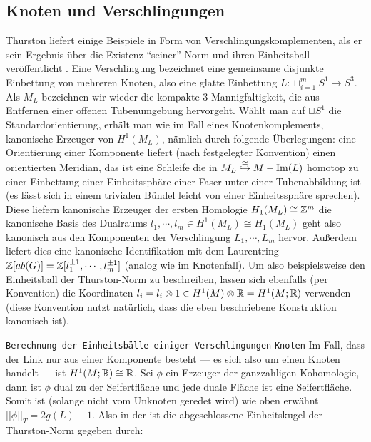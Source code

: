     \subsection{Knoten und Verschlingungen}
    \label{sec:links}
    \begin{bsp}[Verschlingungen]
    \label{ex:links}
        Thurston liefert einige Beispiele in Form von Verschlingungskomplementen, als er sein Ergebnis über die Existenz "`seiner"' Norm und ihren Einheitsball veröffentlicht \cite{Thurston.1986}. Eine Verschlingung bezeichnet eine gemeinsame disjunkte Einbettung von mehreren Knoten, also eine glatte Einbettung $L: \sqcup_{i=1}^m S^1 \to S^3$. Als $M_L$ bezeichnen wir wieder die kompakte 3-Mannigfaltigkeit, die aus Entfernen einer offenen Tubenumgebung hervorgeht. Wählt man auf $\sqcup S^1$ die Standardorientierung, erhält man wie im Fall eines Knotenkomplements, kanonische Erzeuger von $H^1(M_L)$, nämlich durch folgende Überlegungen: eine Orientierung einer Komponente liefert (nach festgelegter Konvention) einen orientierten Meridian, das ist eine Schleife die in $M_L\stackrel \simeq {\hookrightarrow} M - \operatorname{Im}(L)$ homotop zu einer Einbettung einer Einheitssphäre einer Faser unter einer Tubenabbildung ist (es lässt sich in einem trivialen Bündel leicht von einer Einheitssphäre sprechen). Diese liefern kanonische Erzeuger der ersten Homologie $H_1(M_L) \cong \mathbb{Z}^m$ die kanonische Basis des Dualraums $l_1,\cdots,l_m \in H^1(M_L)\cong H_1(M_L)$ geht also kanonisch aus den Komponenten der Verschlingung $L_1,\cdots,L_m$ hervor. Außerdem liefert dies eine kanonische Identifikation mit dem Laurentring $\mathbb{Z}[ab(G)]=\mathbb{Z}[l_1^{\pm 1},\cdots,l_m^{\pm 1}]$ (analog wie im Knotenfall). Um also beispielsweise den Einheitsball der Thurston-Norm zu beschreiben, lassen sich ebenfalls (per Konvention) die Koordinaten $l_i=l_i \otimes 1 \in H^1(M)\otimes \mathbb{R} = H^1(M;\mathbb{R})$ verwenden (diese Konvention nutzt natürlich, dass die eben beschriebene Konstruktion kanonisch ist).\\

    \end{bsp}
        \texttt{Berechnung der Einheitsbälle einiger Verschlingungen}
        \texttt{Knoten}
        Im Fall, dass der Link nur aus einer Komponente besteht --- es sich also um einen Knoten handelt --- ist $H^1(M;\mathbb{R})\cong \mathbb{R}$. Sei $\phi$ ein Erzeuger der ganzzahligen Kohomologie, dann ist $\phi$ dual zu der Seifertfläche und jede duale Fläche ist eine Seifertfläche. Somit ist (solange nicht vom Unknoten geredet wird) wie oben erwähnt $||\phi||_T=2g(L)+1$. Also in der ist die abgeschlossene Einheitskugel der Thurston-Norm gegeben durch:
